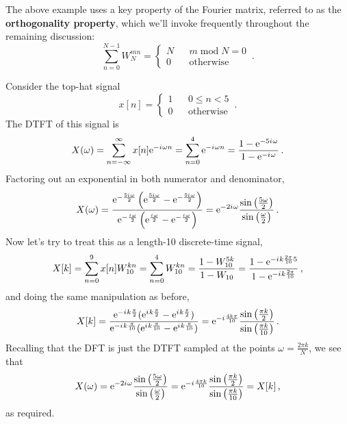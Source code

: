 %
The above example uses a key property of the Fourier matrix, referred to
as the \textbf{orthogonality property}, which we'll invoke frequently
throughout the remaining discussion:
%
\begin{equation}
  \sum_{n=0}^{N-1}W_N^{mn} = \left\{\begin{array}{ccl}
    N & & m\;\mathrm{mod}\;N = 0 \\
    0 & & \mathrm{otherwise} 
  \end{array}\right. \,.
\end{equation}
%
\begin{exmp}
  Consider the top-hat signal
  \begin{displaymath}
    x[n] =
    \left\{\begin{array}{ccl}
    1 & & 0 \leq n < 5 \\
    0 & & \mathrm{otherwise}
    \end{array}\right. \,.
  \end{displaymath}
  The DTFT of this signal is
  \begin{displaymath}
    X(\omega) = \sum_{n=-\infty}^\infty x[n]\mathrm{e}^{-{i\mkern1mu}\omega n}
    = \sum_{n=0}^4\mathrm{e}^{-{i\mkern1mu}\omega n}
    = \frac{1 - \mathrm{e}^{-5{i\mkern1mu}\omega}}{1 - \mathrm{e}^{-{i\mkern1mu}\omega}} \,.
  \end{displaymath}
  Factoring out an exponential in both numerator and denominator,
  \begin{displaymath}
    X(\omega) = \frac{
      \mathrm{e}^{-\frac{5{i\mkern1mu}\omega}{2}}\left(\mathrm{e}^{\frac{5{i\mkern1mu}\omega}{2}} - \mathrm{e}^{-\frac{5{i\mkern1mu}\omega}{2}}\right)
    }{
      \mathrm{e}^{-\frac{{i\mkern1mu}\omega}{2}}\left(\mathrm{e}^{\frac{{i\mkern1mu}\omega}{2}} - \mathrm{e}^{-\frac{{i\mkern1mu}\omega}{2}}\right)
    } = \mathrm{e}^{-2{i\mkern1mu}\omega}\frac{
      \sin\left(\frac{5\omega}{2}\right)
    }{
      \sin\left(\frac{\omega}{2}\right)
    } \,.
  \end{displaymath}
  Now let's try to treat this as a length-10 discrete-time signal,
  \begin{displaymath}
    X[k] = \sum_{n=0}^9 x[n]W_{10}^{kn} = \sum_{n=0}^4 W_{10}^{kn}
    = \frac{1 - W_{10}^{5k}}{1 - W_{10}}
    = \frac{1 - \mathrm{e}^{-{i\mkern1mu} k \frac{2\pi}{10}5}}{1 - \mathrm{e}^{-{i\mkern1mu} k \frac{2\pi}{10}}} \,,
  \end{displaymath}
  and doing the same manipulation as before,
  \begin{displaymath}
    X[k] = \frac{
      \mathrm{e}^{-{i\mkern1mu} k\frac{\pi}{2}}(\mathrm{e}^{{i\mkern1mu} k\frac{\pi}{2}} - \mathrm{e}^{{i\mkern1mu} k\frac{\pi}{2}}) 
    }{
      \mathrm{e}^{-{i\mkern1mu} k\frac{\pi}{10}}(\mathrm{e}^{{i\mkern1mu} k\frac{\pi}{10}} - \mathrm{e}^{{i\mkern1mu} k\frac{\pi}{10}}) 
    } = \mathrm{e}^{-{i\mkern1mu}\frac{4k\pi}{10}} \frac{
      \sin\left(\frac{\pi k}{2}\right)
    }{
      \sin\left(\frac{\pi k}{10}\right)
    } \,.
  \end{displaymath}
  Recalling that the DFT is just the DTFT sampled at the points
  $\omega = \frac{2\pi k}{N}$, we see that
  \begin{displaymath}
    X(\omega) = \mathrm{e}^{-2{i\mkern1mu}\omega}\frac{
      \sin\left(\frac{5\omega}{2}\right)
    }{
      \sin\left(\frac{\omega}{2}\right)
    } =
    \mathrm{e}^{-{i\mkern1mu}\frac{4\pi k}{10}}\frac{
      \sin\left(\frac{\pi k}{2}\right)
    }{
      \sin\left(\frac{\pi k}{10}\right)
    } = X[k] \,,
  \end{displaymath}
  as required.
\end{exmp}

